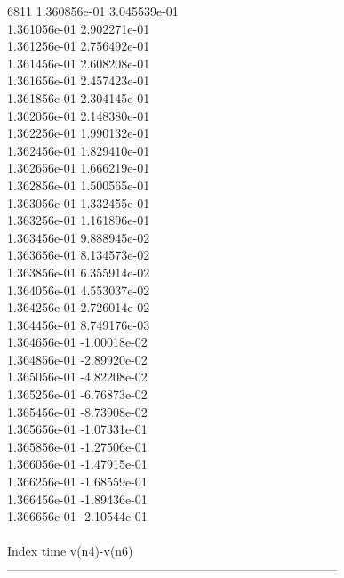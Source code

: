 6811	1.360856e-01	3.045539e-01	\\ 	1.361056e-01	2.902271e-01	\\ 	1.361256e-01	2.756492e-01	\\ 	1.361456e-01	2.608208e-01	\\ 	1.361656e-01	2.457423e-01	\\ 	1.361856e-01	2.304145e-01	\\ 	1.362056e-01	2.148380e-01	\\ 	1.362256e-01	1.990132e-01	\\ 	1.362456e-01	1.829410e-01	\\ 	1.362656e-01	1.666219e-01	\\ 	1.362856e-01	1.500565e-01	\\ 	1.363056e-01	1.332455e-01	\\ 	1.363256e-01	1.161896e-01	\\ 	1.363456e-01	9.888945e-02	\\ 	1.363656e-01	8.134573e-02	\\ 	1.363856e-01	6.355914e-02	\\ 	1.364056e-01	4.553037e-02	\\ 	1.364256e-01	2.726014e-02	\\ 	1.364456e-01	8.749176e-03	\\ 	1.364656e-01	-1.00018e-02	\\ 	1.364856e-01	-2.89920e-02	\\ 	1.365056e-01	-4.82208e-02	\\ 	1.365256e-01	-6.76873e-02	\\ 	1.365456e-01	-8.73908e-02	\\ 	1.365656e-01	-1.07331e-01	\\ 	1.365856e-01	-1.27506e-01	\\ 	1.366056e-01	-1.47915e-01	\\ 	1.366256e-01	-1.68559e-01	\\ 	1.366456e-01	-1.89436e-01	\\ 	1.366656e-01	-2.10544e-01	\\ \hline
\\ \hline
Index   time            v(n4)-v(n6)     \\ \hline
--------------------------------------------------------------------------------\\ \hline
